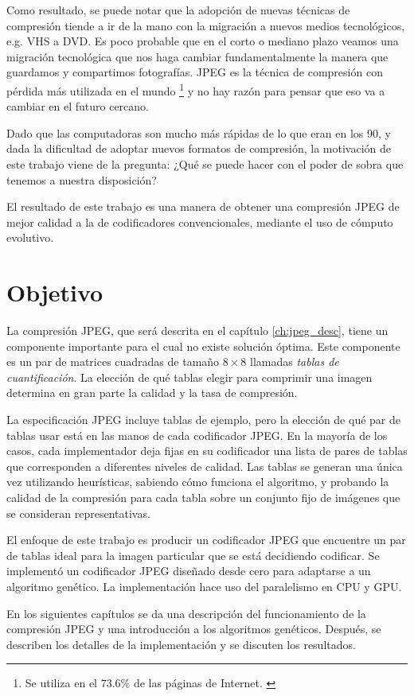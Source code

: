 Como resultado, se puede notar que la adopción de nuevas técnicas de compresión
tiende a ir de la mano con la migración a nuevos medios tecnológicos, e.g. VHS
a DVD. Es poco probable que en el corto o mediano plazo veamos una migración
tecnológica que nos haga cambiar fundamentalmente la manera que guardamos y
compartimos fotografías. JPEG es la técnica de \gls{compresión con pérdida} más
utilizada en el mundo \footnote{Se utiliza en el 73.6\% de las páginas de
Internet. \cite{wtc_link} } y no hay razón para
pensar que eso va a cambiar en el futuro cercano.

Dado que las computadoras son mucho más rápidas de lo que eran en los 90, y
dada la dificultad de adoptar nuevos formatos de compresión, la motivación de
este trabajo viene de la pregunta:  ¿Qué se puede hacer con el poder de sobra
que tenemos a nuestra disposición?

El resultado de este trabajo es una manera de obtener una compresión JPEG de mejor
calidad a la de codificadores convencionales, mediante el uso de \gls{cómputo evolutivo}.

\section{Objetivo}

La compresión JPEG, que será descrita en el capítulo \ref{ch:jpeg_desc}, tiene
un componente importante para el cual no existe solución óptima. Este
componente es un par de matrices cuadradas de tamaño $8\times8$ llamadas
\emph{\gls{tablas de cuantificación}}. La elección de qué tablas elegir para
comprimir una imagen determina en gran parte la calidad y la tasa de compresión.

La especificación JPEG \cite{jpeg-spec} incluye tablas de ejemplo, pero la
elección de qué par de tablas usar está en las manos de cada codificador
JPEG. En la mayoría de los casos, cada implementador deja fijas en su
codificador una lista de pares de tablas que corresponden a diferentes
niveles de calidad. Las tablas se generan una única vez utilizando heurísticas,
sabiendo cómo funciona el algoritmo, y probando la calidad de la compresión
para cada tabla sobre un conjunto fijo de imágenes que se consideran
representativas.

El enfoque de este trabajo es producir un codificador JPEG que encuentre un par
de tablas ideal para la imagen particular que se está decidiendo codificar.
Se implementó un codificador JPEG diseñado desde cero para adaptarse a un
algoritmo genético. La implementación hace uso del paralelismo en CPU y GPU.

En los siguientes capítulos se da una descripción del funcionamiento de la
compresión JPEG y una introducción a los algoritmos genéticos. Después, se
describen los detalles de la implementación y se discuten los resultados.



